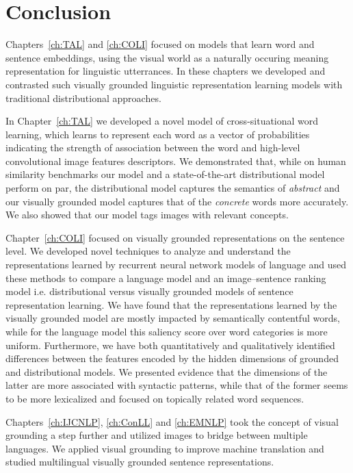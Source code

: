 \section{Conclusion}

Chapters~\ref{ch:TAL} and \ref{ch:COLI} focused on models that learn word and sentence embeddings, 
using the visual world as a naturally occuring meaning representation for linguistic utterrances. 
In these chapters we developed and contrasted such visually grounded linguistic representation learning
models with traditional distributional approaches. 

In Chapter~\ref{ch:TAL} we developed a novel model of cross-situational word learning, which learns to represent
each word as a vector of probabilities indicating the strength of association between the word and high-level 
convolutional image features descriptors. 
We demonstrated that, while on human similarity benchmarks our model and a state-of-the-art distributional model 
perform on par, the distributional model captures the semantics of \emph{abstract} and our visually grounded model 
captures that of the \emph{concrete} words more accurately. We also showed that our model tags images with relevant
concepts.
  
Chapter~\ref{ch:COLI} focused on visually grounded representations on the sentence level. 
We developed novel techniques to analyze and understand the representations learned by recurrent
neural network models of language and used these methods to compare a language model and an image--sentence ranking
model i.e. distributional versus visually grounded models of sentence representation learning. We have found that the 
representations learned by the visually grounded model are mostly impacted by semantically contentful words, while
for the language model this saliency score over word categories is more uniform. Furthermore, we have 
both quantitatively and qualitatively identified differences between the features encoded by the hidden dimensions
of grounded and distributional models. We presented evidence that
the dimensions of the latter are more associated with syntactic patterns, while  that of the former seems 
to be more lexicalized and focused on topically related word sequences.

Chapters~\ref{ch:IJCNLP}, \ref{ch:ConLL} and \ref{ch:EMNLP} took the concept of visual grounding 
a step further and utilized images to bridge between multiple languages. We applied visual grounding 
to improve machine translation and studied multilingual visually grounded sentence representations.

